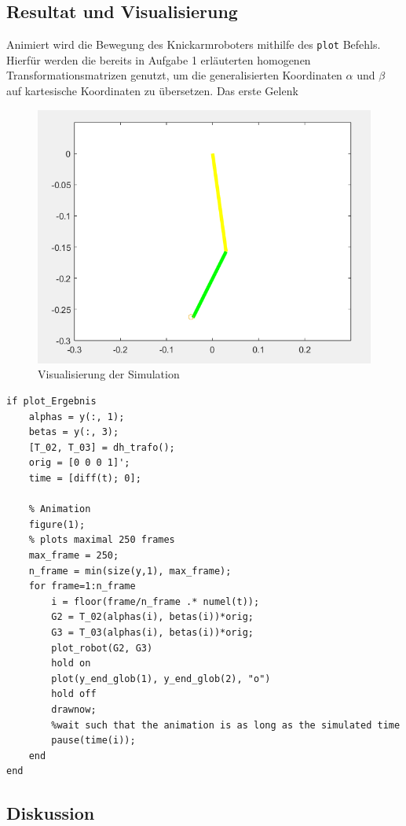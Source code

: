 \subsection*{Resultat und Visualisierung}

Animiert wird die Bewegung des Knickarmroboters mithilfe des \texttt{plot} Befehls. Hierfür werden die bereits in Aufgabe 1 erläuterten homogenen Transformationsmatrizen genutzt, um die generalisierten Koordinaten $\alpha$ und $\beta$ auf kartesische Koordinaten zu übersetzen. Das erste Gelenk 

\begin{figure}[H]
    \centering
    \includegraphics[width=0.8\linewidth]{img/visualisierung.png}
    \caption{Visualisierung der Simulation}
    \label{fig:visualisierung}
\end{figure}


\begin{lstlisting}[caption={Definition der rechten Seite},label={lst:wrapper}]
    %% Visualization
if plot_Ergebnis
    alphas = y(:, 1);
    betas = y(:, 3);
    [T_02, T_03] = dh_trafo();
    orig = [0 0 0 1]';
    time = [diff(t); 0];
    
    % Animation
    figure(1);
    % plots maximal 250 frames
    max_frame = 250;
    n_frame = min(size(y,1), max_frame);
    for frame=1:n_frame
        i = floor(frame/n_frame .* numel(t));
        G2 = T_02(alphas(i), betas(i))*orig;
        G3 = T_03(alphas(i), betas(i))*orig;
        plot_robot(G2, G3)
        hold on
        plot(y_end_glob(1), y_end_glob(2), "o")
        hold off
        drawnow;
        %wait such that the animation is as long as the simulated time
        pause(time(i));
    end
end
\end{lstlisting}




\subsection*{Diskussion}